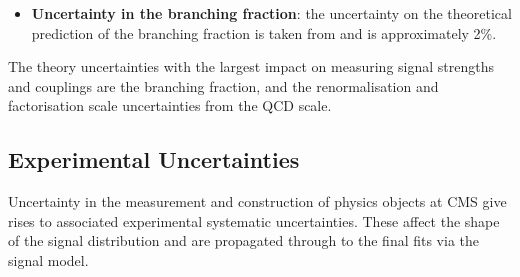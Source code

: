 \begin{itemize}[noitemsep]
{\begin{itemize}[noitemsep]
        \end{itemize}}
    \item{\textbf{Uncertainty in the \Hgg branching fraction}: the uncertainty on the theoretical prediction of the \Hgg branching fraction is taken from \cite{LHCHXS} and is approximately 2\%.}
\end{itemize}

The theory uncertainties with the largest impact on measuring signal strengths and couplings are the \Hgg branching fraction, and the renormalisation and factorisation scale uncertainties from the QCD scale. 



\subsection{Experimental Uncertainties}
Uncertainty in the measurement and construction of physics objects at CMS give rises to associated experimental systematic uncertainties. 
These affect the shape of the signal distribution and are propagated through to the final fits via the signal model. 
